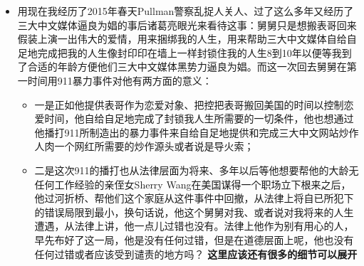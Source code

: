 \documentclass[9pt, b5paper]{article}
\begin{document}
\begin{itemize}
\begin{itemize}
\begin{itemize}
\item 用现在我经历了2015年春天Pullman警察乱捉人关人、过了这么多年又经历了三大中文媒体逼良为娼的事后诸葛亮眼光来看待这事：舅舅只是想搬表哥回来假装上演一出伟大的爱情，用来捆绑我的人生，用来帮助三大中文媒体自给自足地完成把我的人生像封印印在墙上一样封锁住我的人生8到10年以便等我到了合适的年龄方便他们三大中文媒体黑势力逼良为娼。而这一次回去舅舅在第一时间用911暴力事件对他有两方面的意义：
\begin{itemize}
\item 一是正如他提供表哥作为恋爱对象、把控把表哥搬回美国的时间以控制恋爱时间，他自给自足地完成了封锁我人生所需要的一切条件，他也想通过他播打911所制造出的暴力事件来自给自足地提供和完成三大中文网站炒作人肉一个网红所需要的炒作源头或者说是导火索；
\item 二是这次911的播打也从法律层面为将来、多年以后等他想要帮他的大龄无任何工作经验的亲侄女Sherry Wang在美国谋得一个职场立下根来之后，他过河折桥、帮他们这个家庭从这件事件中回撤，从法律上将自已所犯下的错误局限到最小，换句话说，他这个舅舅对我、或者说对我将来的人生遭遇，从法律上讲，他一点儿过错也没有。法律上他作为别有用心的人，早先布好了这一局，他是没有任何过错，但是在道德层面上呢，他也没有任何过错或者应该受到谴责的地方吗？ \textbf{这里应该还有很多的细节可以展开}

\end{itemize}
\end{itemize}
\end{itemize}
\end{itemize}
\end{document}
